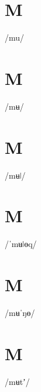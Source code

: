 \documentclass[10pt,a4paper,twoside]{book}
\begin{document}
\section*{M}

\begin{multicols}{3}
 {/mu/} {}
\end{multicols}

\section*{M}

\begin{multicols}{3}
 {/mʉ/} {}
\end{multicols}

\section*{M}

\begin{multicols}{3}
 {/mʉǀ/} {}
\end{multicols}

\section*{M}

\begin{multicols}{3}
 {/ˈmʉǀɵq/} {}
\end{multicols}

\section*{M}

\begin{multicols}{3}
 {/mʉˈŋɵ/} {}
\end{multicols}

\section*{M}

\begin{multicols}{3}
 {/mʉtʼ/} {}
\end{multicols}
\end{document}
